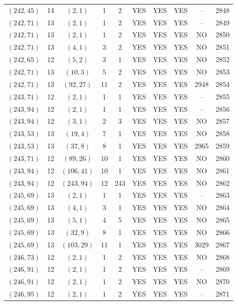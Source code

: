 \begin{longtable}{|c|c|c|c|c|c|c|c|c|c|}
$(242, 45)$ & 14 & $(2, 1)$ & 1 & 2 & YES & YES & YES & -- & 2848\\
$(242, 71)$ & 13 & $(2, 1)$ & 1 & 2 & YES & YES & YES & -- & 2849\\
$(242, 71)$ & 13 & $(2, 1)$ & 1 & 2 & YES & YES & YES & NO & 2850\\
$(242, 71)$ & 13 & $(4, 1)$ & 3 & 2 & YES & YES & YES & NO & 2851\\
$(242, 65)$ & 12 & $(5, 2)$ & 3 & 1 & YES & YES & YES & NO & 2852\\
$(242, 71)$ & 13 & $(10, 3)$ & 5 & 2 & YES & YES & YES & NO & 2853\\
$(242, 71)$ & 13 & $(92, 27)$ & 11 & 2 & YES & YES & YES & 2948 & 2854\\
$(243, 71)$ & 12 & $(2, 1)$ & 1 & 1 & YES & YES & YES & -- & 2855\\
$(243, 94)$ & 12 & $(2, 1)$ & 1 & 1 & YES & YES & YES & -- & 2856\\
$(243, 94)$ & 12 & $(3, 1)$ & 2 & 3 & YES & YES & YES & NO & 2857\\
$(243, 53)$ & 13 & $(19, 4)$ & 7 & 1 & YES & YES & YES & NO & 2858\\
$(243, 53)$ & 13 & $(37, 8)$ & 8 & 1 & YES & YES & YES & 2965 & 2859\\
$(243, 71)$ & 12 & $(89, 26)$ & 10 & 1 & YES & YES & YES & NO & 2860\\
$(243, 94)$ & 12 & $(106, 41)$ & 10 & 1 & YES & YES & YES & NO & 2861\\
$(243, 94)$ & 12 & $(243, 94)$ & 12 & 243 & YES & YES & YES & NO & 2862\\
$(245, 69)$ & 13 & $(2, 1)$ & 1 & 1 & YES & YES & YES & -- & 2863\\
$(245, 69)$ & 13 & $(4, 1)$ & 3 & 1 & YES & YES & YES & NO & 2864\\
$(245, 69)$ & 13 & $(5, 1)$ & 4 & 5 & YES & YES & YES & NO & 2865\\
$(245, 69)$ & 13 & $(32, 9)$ & 8 & 1 & YES & YES & YES & NO & 2866\\
$(245, 69)$ & 13 & $(103, 29)$ & 11 & 1 & YES & YES & YES & 3029 & 2867\\
$(246, 73)$ & 12 & $(2, 1)$ & 1 & 2 & YES & YES & YES & NO & 2868\\
$(246, 91)$ & 12 & $(2, 1)$ & 1 & 2 & YES & YES & YES & -- & 2869\\
$(246, 91)$ & 12 & $(2, 1)$ & 1 & 2 & YES & YES & YES & NO & 2870\\
$(246, 95)$ & 12 & $(2, 1)$ & 1 & 2 & YES & YES & YES & -- & 2871\\

\end{longtable}
